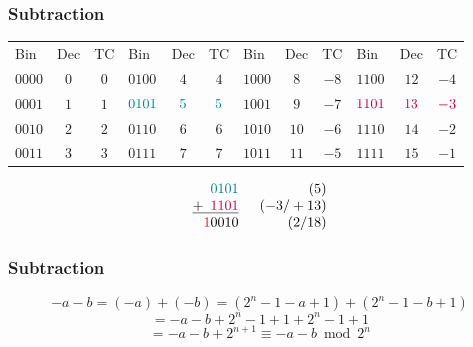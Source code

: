 \documentclass[aspectratio=169]{beamer}
\newif\iftransitions
\begin{document}
\begin{frame}
  \frametitle{Subtraction}
  
  \begin{tabular}{l c c|l c c|l c c|l c c}
  Bin & Dec & TC & Bin & Dec & TC & Bin & Dec & TC & Bin & Dec & TC \\
  $0000$ & $ 0$ & $0$ & $0100$ & $ 4$ & $4$ & $1000$ & $ 8$ & $-8$ & $1100$ & $12$ & $-4$ \\
  $0001$ & $ 1$ & $1$ & $\textcolor{teal}{0101}$ & $\textcolor{teal}{ 5}$ & $\textcolor{teal}{ 5}$ & $1001$ & $ 9$ & $-7$ & $\textcolor{purple}{1101}$ & $\textcolor{purple}{13}$ & $\textcolor{purple}{-3}$ \\
  $0010$ & $ 2$ & $2$ & $0110$ & $ 6$ & $6$ & $1010$ & $10$ & $-6$ & $1110$ & $14$ & $-2$ \\
  $0011$ & $ 3$ & $3$ & $0111$ & $ 7$ & $7$ & $1011$ & $11$ & $-5$ & $1111$ & $15$ & $-1$ \\
  \end{tabular}
  
  \vspace{20pt}

  \begin{equation*}\begin{array}{c}
   \phantom{+9}\textcolor{teal}{0101} \phantom{999-+/99} (5) \\
   \underline{+\phantom{9}\textcolor{purple}{1101}} \phantom{999} (-3/+13) \\
   \phantom{+}\textcolor{red}{1}0010 \phantom{999-+} (2/18)
  \end{array}\end{equation*}
\end{frame}


\begin{frame}
  \frametitle{Subtraction}
  
  \begin{equation*}
    -a - b = (-a) + (-b) = (2^n - 1 - a + 1) + (2^n - 1 - b + 1)
  \end{equation*} \iftransitions \pause \fi 
  \begin{equation*}
    = -a - b + 2^n - 1 + 1 + 2^n - 1 + 1
  \end{equation*} \iftransitions \pause \fi 
  \begin{equation*}
    = -a - b + 2^{n+1} \equiv -a - b \bmod 2^n
  \end{equation*}
\end{frame}
\end{document}
